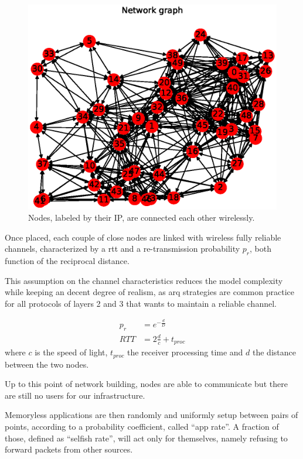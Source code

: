 \documentclass[conference,10.5pt]{IEEEtran}
\begin{document}
\begin{figure}[h]
  \centering
  \includegraphics[width=\linewidth]{figures/example_graph}
  \caption{Nodes, labeled by their IP, are connected each other wirelessly.}
  \label{fig:nodes}
\end{figure}

Once placed, each couple of close nodes are linked with wireless fully reliable channels, characterized by a \gls{rtt} and a re-transmission probability $p_r$, both function of the reciprocal distance.

This assumption on the channel characteristics reduces the model complexity while keeping an decent degree of realism, as \gls{arq} strategies are common practice for all protocols of layers 2 and 3 that wants to maintain a reliable channel.

\begin{equation}
  \begin{split}
    p_r & = e^{-\frac{d}{D}} \\
    RTT &= 2 \frac{d}{c} + t_{proc}
  \end{split}
\end{equation}
where $c$ is the speed of light, $t_{proc}$ the receiver processing time and $d$ the distance between the two nodes.
\smallskip

Up to this point of network building, nodes are able to communicate but there are still no users for our infrastructure.

Memoryless applications are then randomly and uniformly setup between pairs of points, according to a probability coefficient, called ``app rate''. A fraction of those, defined as ``selfish rate'', will act only for themselves, namely refusing to forward packets from other sources.
\end{document}
